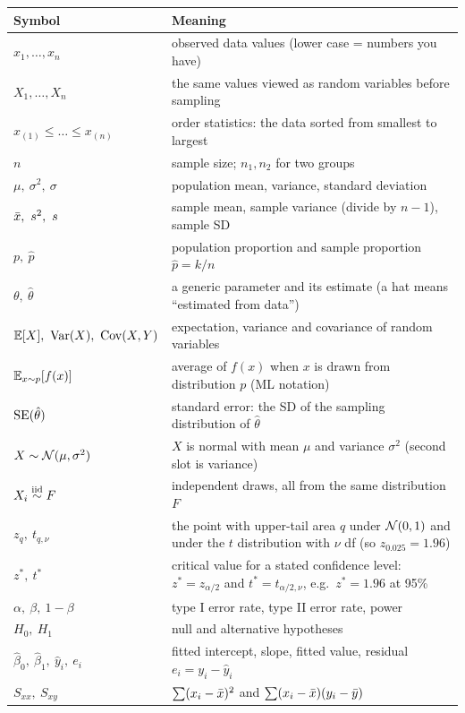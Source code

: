 \begin{center}
\small
\begin{tabular}{@{}p{4.0cm}p{10.8cm}@{}}
\toprule
Symbol & Meaning \\
\midrule
$x_1,\dots,x_n$ & observed data values (lower case = numbers you have) \\
$X_1,\dots,X_n$ & the same values viewed as random variables before sampling \\
$x_{(1)}\le\dots\le x_{(n)}$ & order statistics: the data sorted from smallest to largest \\
$n$ & sample size; $n_1,n_2$ for two groups \\
$\mu,\ \sigma^2,\ \sigma$ & population mean, variance, standard deviation \\
$\xbar,\ s^2,\ s$ & sample mean, sample variance (divide by $n-1$), sample SD \\
$p,\ \hat p$ & population proportion and sample proportion $\hat p = k/n$ \\
$\theta,\ \hat\theta$ & a generic parameter and its estimate (a hat means ``estimated from data'') \\
$\E[X],\ \Var(X),\ \Cov(X,Y)$ & expectation, variance and covariance of random variables \\
$\operatorname{\mathbb{E}}_{x\sim p}[f(x)]$ & average of $f(x)$ when $x$ is drawn from distribution $p$ (ML notation) \\
$\operatorname{SE}(\hat\theta)$ & standard error: the SD of the sampling distribution of $\hat\theta$ \\
$X\sim \mathcal{N}(\mu,\sigma^2)$ & $X$ is normal with mean $\mu$ and variance $\sigma^2$ (second slot is variance) \\
$X_i \overset{\text{iid}}{\sim} F$ & independent draws, all from the same distribution $F$ \\
$z_{q},\ t_{q,\nu}$ & the point with upper-tail area $q$ under $\mathcal{N}(0,1)$ and under the $t$ distribution with $\nu$ df (so $z_{0.025}=1.96$) \\
$z^*,\ t^*$ & critical value for a stated confidence level: $z^*=z_{\alpha/2}$ and $t^*=t_{\alpha/2,\nu}$, e.g.\ $z^*=1.96$ at 95\% \\
$\alpha,\ \beta,\ 1-\beta$ & type I error rate, type II error rate, power \\
$H_0,\ H_1$ & null and alternative hypotheses \\
$\hat\beta_0,\ \hat\beta_1,\ \hat y_i,\ e_i$ & fitted intercept, slope, fitted value, residual $e_i=y_i-\hat y_i$ \\
$S_{xx},\ S_{xy}$ & $\sum (x_i-\bar{x})^2$ and $\sum (x_i-\bar{x})(y_i-\bar{y})$ \\
\bottomrule
\end{tabular}
\end{center}

